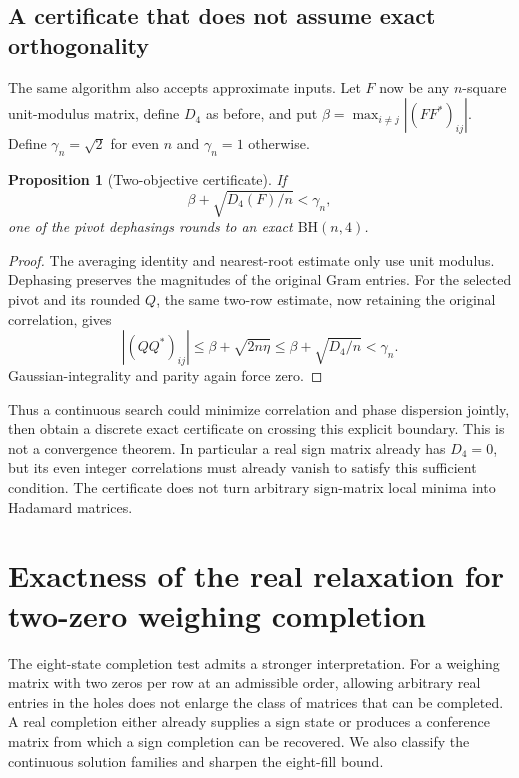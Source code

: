 \documentclass[11pt]{article}
\newtheorem{proposition}[theorem]{Proposition}
\begin{document}
\subsection{A certificate that does not assume exact orthogonality}
The same algorithm also accepts approximate inputs.
Let $F$ now be any $n$-square unit-modulus matrix, define $D_4$ as
before, and put $\beta=\max_{i\ne j}|(FF^*)_{ij}|$.
Define $\gamma_n=\sqrt2$ for even $n$ and $\gamma_n=1$ otherwise.
\begin{proposition}[Two-objective certificate]
If
\[
 \beta+\sqrt{D_4(F)/n}<\gamma_n,
\]
one of the pivot dephasings rounds to an exact $\mathrm{BH}(n,4)$.
\end{proposition}
\begin{proof}
The averaging identity and nearest-root estimate only use unit modulus.
Dephasing preserves the magnitudes of the original Gram entries.
For the selected pivot and its rounded $Q$, the same two-row
estimate, now retaining the original correlation, gives
\[
 |(QQ^*)_{ij}|\le\beta+\sqrt{2n\eta}
 \le\beta+\sqrt{D_4/n}<\gamma_n.
\]
Gaussian-integrality and parity again force zero.
\end{proof}
Thus a continuous search could minimize correlation and phase dispersion
jointly, then obtain a discrete exact certificate on crossing this
explicit boundary. This is not a convergence theorem. In particular a
real sign matrix already has $D_4=0$, but its even integer correlations
must already vanish to satisfy this sufficient condition. The certificate
does not turn arbitrary sign-matrix local minima into Hadamard matrices.
\section{Exactness of the real relaxation for two-zero weighing completion}
\label{sec:real-weighing-exactness}

The eight-state completion test admits a stronger interpretation.
For a weighing matrix with two zeros per row at an admissible order,
allowing arbitrary real entries in the holes does not enlarge the
class of matrices that can be completed. A real completion either
already supplies a sign state or produces a conference matrix from
which a sign completion can be recovered. We also classify the
continuous solution families and sharpen the eight-fill bound.
\end{document}
